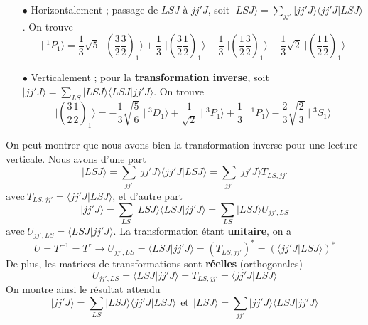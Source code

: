 \begin{itemize}
\item[$\bullet$] Horizontalement ; passage de $LSJ$ à $jj'J$, soit $ \vert LS J \rangle =
 \sum_{ j j' } \vert jj'J \rangle
\langle jj'J
 \vert LS J \rangle$. On trouve
 \begin{equation}
  \vert \; ^1P_1 \rangle =
\frac{1}{3} \sqrt{5}  \; 
\vert \left(
  \frac{3}{2}  \frac{3}{2} \right)_1 \rangle
+
\frac{1}{3}  \; 
\vert \left(
  \frac{3}{2}  \frac{1}{2} \right)_1 \rangle
-
\frac{1}{3}  \; 
\vert \left(
  \frac{1}{2}  \frac{3}{2} \right)_1 \rangle
+
\frac{1}{3} \sqrt{2}  \; 
\vert \left(
  \frac{1}{2}  \frac{1}{2} \right)_1 \rangle
 \end{equation}
\item[$\bullet$] Verticalement ; pour la \textbf{transformation inverse}, soit 
$ \vert jj' J \rangle =
 \sum_{ LS } \vert LSJ \rangle
\langle LSJ
 \vert jj' J \rangle$. On trouve
 \begin{equation}
 \vert \left(
  \frac{3}{2}  \frac{1}{2} \right)_1 \rangle
=
-\frac{1}{3} \sqrt{\frac{5}{6}}  \; 
\vert \; ^3D_1 \rangle 
+
\frac{1}{\sqrt{2}}  \; 
\vert \; ^3P_1 \rangle 
+
\frac{1}{3}  \; 
\vert \; ^1P_1 \rangle 
-
\frac{2}{3} \sqrt{\frac{2}{3}}  \; 
\vert \; ^3S_1 \rangle
 \end{equation}
\end{itemize}
On peut montrer que nous avons bien la transformation inverse pour une lecture
verticale. Nous avons d'une part
\begin{equation}
 \vert LS J \rangle =
 \sum_{ j j' } \vert jj'J \rangle
\langle jj'J  \vert LS J \rangle 
=
 \sum_{ j j' } \vert jj'J \rangle T_{LS,jj'}
\end{equation}
$\mbox{avec}~  T_{LS,jj'} = \langle jj'J  \vert LS J \rangle$, et d'autre part
\begin{equation}
 \vert jj' J \rangle =
 \sum_{ LS } \vert LSJ \rangle
\langle LSJ
 \vert jj' J \rangle
= 
\sum_{ LS } \vert LSJ \rangle
U_{jj',LS}
\end{equation} 
$\mbox{avec}~  U_{jj',LS} = \langle LSJ  \vert jj'J\rangle$. La transformation 
étant \textbf{unitaire}, on a 
\begin{equation}
U = T^{-1} = T^{\dagger} 
\rightarrow
U_{jj',LS} = \langle LSJ  \vert jj'J\rangle 
= \left( T_{LS,jj'} \right)^\ast
= \left( \langle jj'J  \vert LSJ \rangle \right) ^\ast
\end{equation}
De plus, les matrices de transformations sont \textbf{réelles} (orthogonales)
\begin{equation}
U_{jj',LS} = \langle LSJ  \vert jj'J\rangle 
=  T_{LS,jj'} 
=  \langle jj'J  \vert LSJ \rangle
\end{equation}
On montre ainsi le résultat attendu
\begin{equation}
 \vert jj' J \rangle =
 \sum_{ LS } \vert LSJ \rangle
\langle jj' J  \vert LSJ  \rangle
~~ \mbox{et} ~~
 \vert LS J \rangle =
 \sum_{ j j' } \vert jj'J \rangle
\langle LSJ   \vert  jj'J \rangle
\end{equation}\ \\


